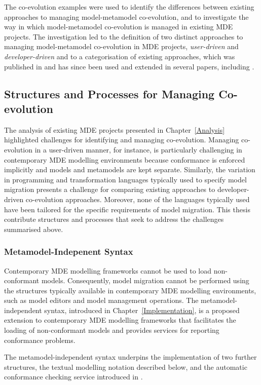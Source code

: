 The co-evolution examples were used to identify the differences between existing approaches to managing model-metamodel co-evolution, and to investigate the way in which model-metamodel co-evolution is managed in existing MDE projects. The investigation led to the definition of two distinct approaches to managing model-metamodel co-evolution in MDE projects, \emph{user-driven} and \emph{developer-driven} and to a categorisation of existing approaches, which was published in \cite{rose09analysis} and has since been used and extended in several papers, including \cite{herrmannsdoerfer10extensive,jurack10towards,mendez10towards}.


\subsection{Structures and Processes for Managing Co-evolution}
The analysis of existing MDE projects presented in Chapter~\ref{Analysis} highlighted challenges for identifying and managing co-evolution. Managing co-evolution in a user-driven manner, for instance, is particularly challenging in contemporary MDE modelling environments because conformance is enforced implicitly and models and metamodels are kept separate. Similarly, the variation in programming and transformation languages typically used to specify model migration presents a challenge for comparing existing approaches to developer-driven co-evolution approaches. Moreover, none of the languages typically used have been tailored for the specific requirements of model migration. This thesis contribute structures and processes that seek to address the challenges summarised above.

\subsubsection{Metamodel-Indepenent Syntax}
Contemporary MDE modelling frameworks cannot be used to load non-conformant models. Consequently, model migration cannot be performed using the structures typically available in contemporary MDE modelling environments, such as model editors and model management operations. The metamodel-independent syntax, introduced in Chapter~\ref{Implementation}, is a proposed extension to contemporary MDE modelling frameworks that facilitates the loading of non-conformant models and provides services for reporting conformance problems.

The metamodel-independent syntax underpins the implementation of two further structures, the textual modelling notation described below, and the automatic conformance checking service introduced in \cite{rose10concordance}. 


